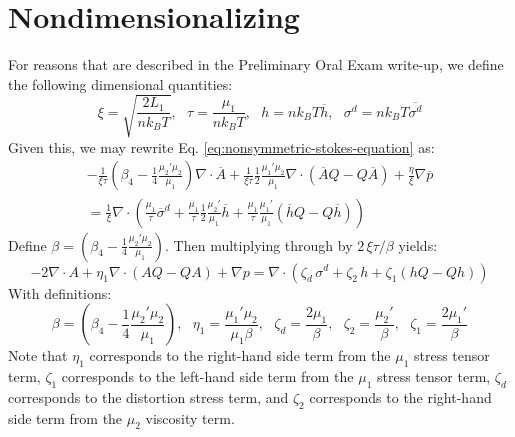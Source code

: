 \documentclass[reqno]{article}
\begin{document}
\section{Nondimensionalizing}
For reasons that are described in the Preliminary Oral Exam write-up, we define
the following dimensional quantities:
\begin{equation}
  \xi = \sqrt{\frac{2 L_1}{n k_B T}}, \:\:\:
  \tau = \frac{\mu_1}{n k_B T}, \:\:\:
  h = n k_B T \overline{h}, \:\:\:
  \sigma^d = n k_B T \overline{\sigma^d}
\end{equation}
Given this, we may rewrite Eq. \eqref{eq:nonsymmetric-stokes-equation} as:
\begin{equation}
  \begin{split}
  -\tfrac{1}{\xi \tau} \left( \beta_4 - \tfrac14 \tfrac{\mu_2' \mu_2}{\mu_1}
  \right) \nabla \cdot \overline{A}
  + \tfrac{1}{\xi \tau} \tfrac12 \tfrac{\mu_1' \mu_2}{\mu_1} \nabla \cdot \left(
    \overline{A}Q - Q \overline{A}
  \right)
  + \tfrac{\eta}{\xi} \nabla \overline{p} \\
  =
  \tfrac{1}{\xi} \nabla \cdot \left(
    \tfrac{\mu_1}{\tau} \overline{\sigma}^d
    + \tfrac{\mu_1}{\tau} \tfrac12 \tfrac{\mu_2'}{\mu_1} \overline{h}
    + \tfrac{\mu_1}{\tau} \tfrac{\mu_1'}{\mu_1} \left(
      \overline{h} Q - Q \overline{h}
    \right)
    \right)
  \end{split}
\end{equation}
Define $\beta = \left( \beta_4 - \tfrac14 \tfrac{\mu_2' \mu_2}{\mu_1} \right)$.
Then multiplying through by $2 \, \xi \tau/\beta$ yields:
\begin{equation}
  -2 \nabla \cdot A
  + \eta_1 \nabla \cdot \left( AQ - QA \right)
  + \nabla p
  =
  \nabla \cdot \left(
    \zeta_d \, \sigma^d
    + \zeta_2 \, h
    + \zeta_1 \left( hQ - Qh \right)
  \right)
\end{equation}
With definitions:
\begin{equation}
  \beta = \left( \beta_4 - \frac14 \frac{\mu_2' \mu_2}{\mu_1} \right), \:\:\:
  \eta_1 = \frac{\mu_1' \mu_2}{\mu_1 \beta}, \:\:\:
  \zeta_d = \frac{2 \mu_1}{\beta}, \:\:\:
  \zeta_2 = \frac{\mu_2'}{\beta}, \:\:\:
  \zeta_1 = \frac{2 \mu_1'}{\beta}
\end{equation}
Note that $\eta_1$ corresponds to the right-hand side term from the $\mu_1$
stress tensor term, $\zeta_1$ corresponds to the left-hand side term from the
$\mu_1$ stress tensor term, $\zeta_d$ corresponds to the distortion stress term,
and $\zeta_2$ corresponds to the right-hand side term from the $\mu_2$ viscosity
term.
\end{document}

